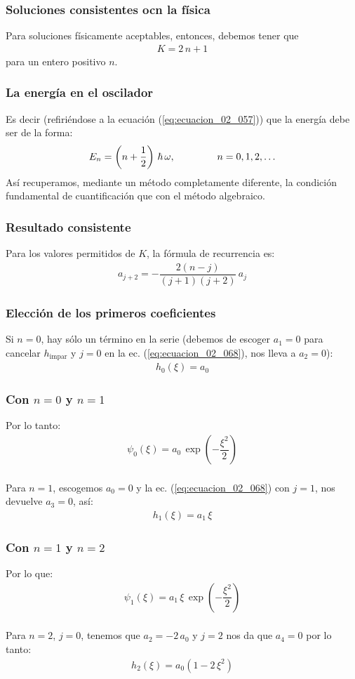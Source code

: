 \documentclass[12pt]{beamer}
\begin{document}
\begin{frame}
\frametitle{Soluciones consistentes ocn la física}
Para soluciones físicamente aceptables, entonces, debemos tener que
\begin{align*}
    K = 2 \, n + 1
\end{align*}
para un entero positivo $n$.
\end{frame}
\begin{frame}
\frametitle{La energía en el oscilador}
Es decir (refiriéndose a la ecuación (\ref{eq:ecuacion_02_057})) que la energía debe ser de la forma:
\pause
\begin{align}
E_{n} = \left( n + \dfrac{1}{2} \right) \, \hbar \, \omega , \hspace{1.5cm} n = 0, 1, 2, \ldots
\label{eq:ecuacion_02_067}
\end{align}
\pause
Así recuperamos, mediante un método completamente diferente, la condición fundamental de cuantificación que con el método algebraico.
\end{frame}
\begin{frame}
\frametitle{Resultado consistente}
Para los valores permitidos de $K$, la fórmula de recurrencia es:
\begin{align}
a_{j+2} = - \dfrac{2 (n - j)}{(j + 1)(j + 2)} \, a_{j}
\label{eq:ecuacion_02_068}
\end{align}
\end{frame}
\begin{frame}
\frametitle{Elección de los primeros coeficientes}
Si $n = 0$, hay sólo un término en la serie (debemos de escoger $a_{1} = 0$ para cancelar $h_{\text{impar}}$ y $j=0$ en la ec. (\ref{eq:ecuacion_02_068}), nos lleva a $a_{2}=0$):
\pause
\begin{align*}
h_{0} (\xi) = a_{0}
\end{align*}
\end{frame}
\begin{frame}
\frametitle{Con $n=0$ y $n=1$}
Por lo tanto:
\pause
\begin{align*}
\psi_{0} (\xi) = a_{0} \, \exp \left( - \dfrac{\xi^{2}}{2} \right)
\end{align*}
\\
\bigskip
\pause
Para $n=1$, escogemos $a_{0} = 0$ y la ec. (\ref{eq:ecuacion_02_068}) con $j = 1$, nos devuelve $a_{3} = 0$, así:
\pause
\begin{align*}
h_{1} (\xi) = a_{1} \, \xi
\end{align*}
\end{frame}
\begin{frame}
\frametitle{Con $n=1$ y $n=2$}
Por lo que:
\pause
\begin{align*}
\psi_{1} (\xi) = a_{1} \, \xi \, \exp \left( - \dfrac{\xi^{2}}{2} \right)
\end{align*}
\\
\bigskip
\pause
Para $n = 2$, $j = 0$, tenemos que $a_{2} = - 2 \, a_{0}$ y $j = 2$ nos da que $a_{4} = 0$ por lo tanto:
\pause
\begin{align*}
h_{2} (\xi) = a_{0} (1 - 2 \, \xi^{2})
\end{align*}
\end{frame}
\end{document}

